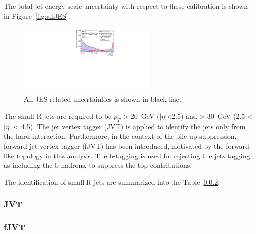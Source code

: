 The total jet energy scale uncertainty with respect to these calibration is shown in Figure~\ref{fig:allJES}.
\begin{figure}[tbp]
    \begin{center}
    \includegraphics[width=0.6\textwidth,keepaspectratio]{figures/Reconstruction/allJES}
    \caption{
    All JES-related uncertainties is shown in black line. \cite{JETM-2018-05}
    }
    \label{fig:in-situcalibration}
    \end{center}
\end{figure}

The small-R jets are required to be $p_T$ > 20~GeV ($|\eta|$<2.5) and > 30~GeV (2.5 < $|\eta|$ < 4.5).
The jet vertex tagger (JVT) is applied to identify the jets only from the hard interaction. Furthermore, in the context of the pile-up suppression, forward jet vertex tagger (fJVT) has been introduced, motivated by the forward-like topology in this analysis.
The b-tagging is used for rejecting the jets tagging as including the b-hadrons, to suppress the top contributions.

The identification of small-R jets are summarized into the Table~\ref{}.


\subsubsection{JVT}
\subsubsection{fJVT}

